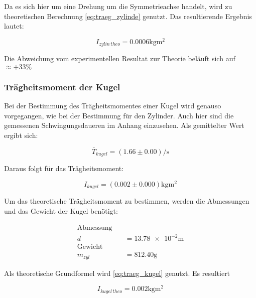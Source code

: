 Da es sich hier um eine Drehung um die Symmetrieachse handelt, wird zu
theoretischen Berechnung \eqref{eq:traeg_zylinde} genutzt.
Das resultierende Ergebnis lautet:

\begin{equation}
\label{eq:traeg_zylinder_theo}
I_{zylin \,theo}= \num{0.0006}\si{\kilogram\meter\squared}
\end{equation}

Die Abweichung vom experimentellen Resultat zur Theorie beläuft sich auf $\approx +33 \%$ %

\subsubsection{Trägheitsmoment der Kugel}

Bei der Bestimmung des Trägheitsmomentes einer Kugel wird genauso vorgegangen, wie bei
der Bestimmung für den Zylinder. %
 Auch hier sind die gemessenen Schwingungsdaueren im Anhang einzusehen.
Als gemittelter Wert ergibt sich:

\begin{equation*}
\bar{T}_{kugel}=\left(\num{1.66}\pm\num{0.00}\right) \si{\per\second}
\end{equation*}

Daraus folgt für das Trägheitsmoment:

\begin{equation}
\label{eq:traeg_kugel_exp}
I_{kugel}=\left(\num{0.002}\pm\num{0.000}\right) \si{\kilogram\meter\squared}
\end{equation}

Um das theoretische Trägheitsmoment zu bestimmen, werden die Abmessungen und das Gewicht der Kugel benötigt:

\begin{align*}
\text{Abmessung} \quad &\\
d&=\num{13.78e-2}\si{\meter}\\
\text{Gewicht} \quad &\\
m_{zyl}&=\num{812.40}\si{\gram}
\end{align*}

Als theoretische Grundformel wird \eqref{eq:traeg_kugel} genutzt.
Es resultiert

\begin{equation}
\label{eq:traeg_kugel_theo}
I_{kugel \,theo}= \num{0.002}\si{\kilogram\meter\squared}
\end{equation}


